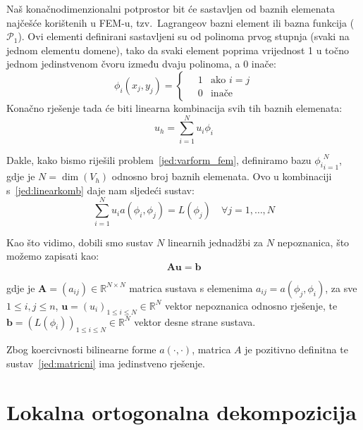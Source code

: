 \documentclass[zavrsnirad]{fer}
\begin{document}
Naš konačnodimenzionalni potprostor bit će sastavljen od baznih elemenata najčešće korištenih u FEM-u,
tzv.\ Lagrangeov bazni element ili bazna funkcija ($\mathcal{P}_1$).
Ovi elementi definirani sastavljeni su od polinoma prvog stupnja (svaki na jednom elementu domene),
tako da svaki element poprima vrijednost 1 u točno jednom jedinstvenom čvoru između dvaju polinoma, a 0 inače:
\begin{equation}
  \label{jed:p1}
  \phi_i(x_j, y_j) = \begin{cases}
    \quad 1 & \text{ako } i = j \\
    \quad 0 & \text{inače}
  \end{cases}
\end{equation}
Konačno rješenje tada će biti linearna kombinacija svih tih baznih elemenata:
\begin{equation}
  \label{jed:linearkomb}
  u_h = \sum_{i=1}^{N} u_i \phi_i
\end{equation}

Dakle, kako bismo riješili problem\ \eqref{jed:varform_fem}, definiramo bazu ${\phi_i}_{i=1}^{N}$,
gdje je $N = \dim(V_h)$ odnosno broj baznih elemenata. Ovo u kombinaciji s\ \eqref{jed:linearkomb}
daje nam sljedeći sustav:
\begin{equation}
  \label{jed:sustav}
  \sum_{i=1}^{N} u_i a(\phi_i, \phi_j) = L(\phi_j) \quad \forall j = 1, \ldots, N
\end{equation}

Kao što vidimo, dobili smo sustav $N$ linearnih jednadžbi za $N$ nepoznanica,
što možemo zapisati kao:
\begin{equation}
  \label{jed:matricni}
  \mathbf{A} \mathbf{u} = \mathbf{b}
\end{equation}

gdje je $\mathbf{A} = (a_{ij}) \in \mathbb{R}^{N \times N}$ matrica sustava s elemenima $a_{ij} = a(\phi_j, \phi_i)$,
za sve $1 \leq i, j \leq n$, $\mathbf{u} = (u_i)_{1 \leq i \leq N} \in \mathbb{R}^N$ vektor nepoznanica odnosno rješenje,
te $\mathbf{b} = {(L(\phi_i))}_{1 \leq i \leq N} \in \mathbb{R}^N$ vektor desne strane sustava.

Zbog koercivnosti bilinearne forme $a(\cdot, \cdot)$, matrica $A$ je pozitivno definitna te sustav\ \eqref{jed:matricni} ima jedinstveno rješenje.


\section{Lokalna ortogonalna dekompozicija}
\end{document}
